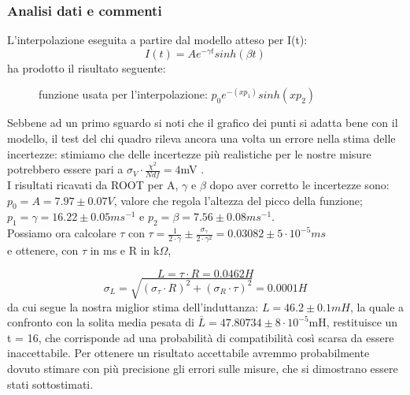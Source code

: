 \documentclass[a4paper]{article}
\theoremstyle{definition}
\begin{document}
\subsubsection*{Analisi dati e commenti}

L'interpolazione eseguita a partire dal modello atteso per I(t):
\[I(t) = Ae^{-\gamma t} sinh(\beta t)\]
ha prodotto il risultato seguente:

\begin{figure}[!ht]
    \captionsetup{labelformat=empty}

	\caption{funzione usata per l'interpolazione:  \(p_{0}e^{-(xp_{1})}sinh(xp_{2})\) }

    \label{fig:sottosmorzamento}

\end{figure}

\noindent Sebbene ad un primo sguardo si noti che il grafico dei punti si adatta bene con il modello, il test del chi quadro rileva ancora una volta un errore nella stima delle incertezze: stimiamo che delle incertezze più realistiche per le nostre misure potrebbero essere pari a \(\sigma_{V} \cdot \frac{\chi^{2}}{Ndf} = 4 \)mV . \\

\noindent I risultati ricavati da ROOT per A, $\gamma$ e $\beta$ dopo aver corretto le incertezze sono: \\
 
\(  p_{0} =  A = 7.97  \pm 0.07V\), valore che regola l'altezza del picco della funzione; \\

\(p_{1}   = \gamma = 16.22 \pm  0.05 ms^{-1}\) e \(p_{2} = \beta = 7.56 \pm  0.08 ms^{-1} \). \\

\noindent Possiamo ora calcolare $\tau$ con \(\tau = \frac{1}{2\cdot \gamma} \pm \frac{\sigma_{\gamma}}{2\cdot \gamma^{2}} =  0.03082 \pm 5 \cdot 10^{-5} ms\) \\
 
\noindent e ottenere, con \(\tau\) in ms e R in k\(\Omega\),

\[L = \tau\cdot R =  0.0462 H \]
 \[\sigma_{L} = \sqrt{(\sigma_{\tau}\cdot R )^{2} + (\sigma_{R} \cdot \tau)^{2}} = 0.0001 H\]
 da cui segue la nostra miglior stima dell'induttanza: \(L = 46.2 \pm 0.1 mH \), la quale a confronto con la solita media pesata di \(\bar{L} = 47.80734 \pm 8 \cdot 10^{-5}\)mH, restituisce un t = 16, che corrisponde ad una probabilità di compatibilità così scarsa da essere inaccettabile. Per ottenere un risultato accettabile avremmo probabilmente dovuto stimare con più precisione gli errori sulle misure, che si dimostrano essere stati sottostimati. \\
\end{document}
